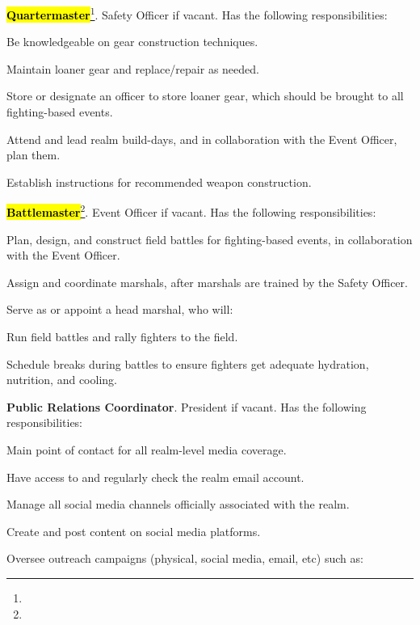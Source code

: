 \documentclass[12pt]{article}
\newcommand{\newpart}[2][]{\hl{#2}\expandafter\ifx\expandafter\relax\detokenize{#1}\relax\else\textnormal{\footnote{#1}}\fi}
\begin{document}
\begin{level}
\begin{level}
    \item \newpart{\textbf{Quartermaster}}. Safety Officer if vacant. Has the following responsibilities:
    \begin{level}
        \item Be knowledgeable on gear construction techniques.
        \item Maintain loaner gear and replace/repair as needed.
        \item Store or designate an officer to store loaner gear, which should be brought to all fighting-based events.
        \item Attend and lead realm build-days, and in collaboration with the Event Officer, plan them.
        \item Establish instructions for recommended weapon construction.
    \end{level}
    \item \newpart{\textbf{Battlemaster}}. Event Officer if vacant. Has the following responsibilities:
    \begin{level}
        \item Plan, design, and construct field battles for fighting-based events, in collaboration with the Event Officer.
        \item Assign and coordinate marshals, after marshals are trained by the Safety Officer.
        \item Serve as or appoint a head marshal, who will:
        \begin{level}
            \item Run field battles and rally fighters to the field.
            \item Schedule breaks during battles to ensure fighters get adequate hydration, nutrition, and cooling.
        \end{level}
    \end{level}
    \item \textbf{Public Relations Coordinator}. President if vacant. Has the following responsibilities:
    \begin{level}
        \item Main point of contact for all realm-level media coverage.
        \item Have access to and regularly check the realm email account.
        \item Manage all social media channels officially associated with the realm.
        \item Create and post content on social media platforms.
        \item Oversee outreach campaigns (physical, social media, email, etc) such as:

\end{level}
\end{level}
\end{level}
\end{document}
